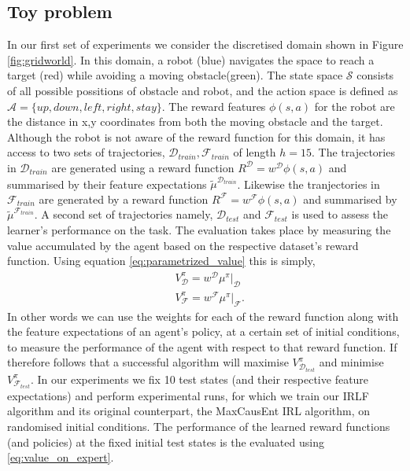 \documentclass[letterpaper]{article}
\begin{document}
\subsection{Toy problem}
In our first set of experiments we consider the discretised domain shown in Figure \ref{fig:gridworld}. In this domain, a robot (blue) navigates the space to reach a target (red) while avoiding a moving
obstacle(green). The state space $\mathcal{S}$ consists of all possible possitions of obstacle and robot, and the action space is defined as $\mathcal{A} = \{up,down,left,right,stay\}$. The reward features $\phi(s,a)$ for the robot are the distance in x,y coordinates from both the moving obstacle and the target.\\
 Although the robot is not aware of the reward function for this domain, it has access to two sets of trajectories, $\mathcal{D}_{train},\mathcal{F}_{train}$ of length $h = 15$. The trajectories in $\mathcal{D}_{train}$ are generated using a reward function $R^\mathcal{D} = w^\mathcal{D}\phi(s,a)$ and summarised by their feature expectations $\widetilde{\mu}^{\mathcal{D}_{train}}$. Likewise the tranjectories in $\mathcal{F}_{train}$ are generated by a reward function $R^\mathcal{F} = w^\mathcal{F}\phi(s,a)$ and summarised by $\widetilde{\mu}^{\mathcal{F}_{train}}$. A second set of trajectories namely, $\mathcal{D}_{test}$ and $ \mathcal{F}_{test}$ is used to assess the learner's performance on the task. The evaluation takes place by measuring the value accumulated by the agent based on the respective dataset's reward function. Using equation \eqref{eq:parametrized_value} this is simply,
\begin{align}
&V^{\pi}_{\mathcal{D}} = w^\mathcal{D}\mu^\pi|_\mathcal{D}\\
&V^{\pi}_{\mathcal{F}} = w^\mathcal{F}\mu^\pi|_\mathcal{F}. \label{eq:value_on_expert}
\end{align}
In other words we can use the weights for each of the reward function along with the feature expectations of an agent's policy, at a certain set of initial conditions, to measure the performance of the agent with respect to that reward function. If therefore follows that a successful algorithm will maximise $V^{\pi}_{\mathcal{D}_{test}}$ and minimise $V^{\pi}_{\mathcal{F}_{test}}$. In our experiments we fix 10 test states (and their respective feature expectations) and perform experimental runs, for which we train our IRLF algorithm and its original counterpart, the MaxCausEnt IRL algorithm, on randomised initial conditions. The performance of the learned reward functions (and policies) at the fixed initial test states is the evaluated using \eqref{eq:value_on_expert}.
\end{document}
